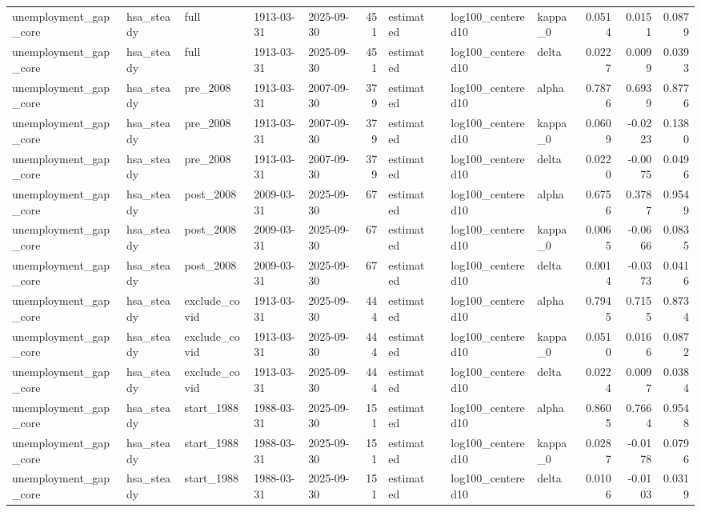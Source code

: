 \begin{tabular}{lllllrllllrrr}
unemployment\_gap\_core & hsa\_steady & full & 1913-03-31 & 2025-09-30 & 451 & estimated &  & log100\_centered10 & kappa\_0 & 0.0514 & 0.0151 & 0.0879 \\
unemployment\_gap\_core & hsa\_steady & full & 1913-03-31 & 2025-09-30 & 451 & estimated &  & log100\_centered10 & delta & 0.0227 & 0.0099 & 0.0393 \\
unemployment\_gap\_core & hsa\_steady & pre\_2008 & 1913-03-31 & 2007-09-30 & 379 & estimated &  & log100\_centered10 & alpha & 0.7876 & 0.6939 & 0.8776 \\
unemployment\_gap\_core & hsa\_steady & pre\_2008 & 1913-03-31 & 2007-09-30 & 379 & estimated &  & log100\_centered10 & kappa\_0 & 0.0609 & -0.0223 & 0.1380 \\
unemployment\_gap\_core & hsa\_steady & pre\_2008 & 1913-03-31 & 2007-09-30 & 379 & estimated &  & log100\_centered10 & delta & 0.0220 & -0.0075 & 0.0496 \\
unemployment\_gap\_core & hsa\_steady & post\_2008 & 2009-03-31 & 2025-09-30 & 67 & estimated &  & log100\_centered10 & alpha & 0.6756 & 0.3787 & 0.9549 \\
unemployment\_gap\_core & hsa\_steady & post\_2008 & 2009-03-31 & 2025-09-30 & 67 & estimated &  & log100\_centered10 & kappa\_0 & 0.0065 & -0.0666 & 0.0835 \\
unemployment\_gap\_core & hsa\_steady & post\_2008 & 2009-03-31 & 2025-09-30 & 67 & estimated &  & log100\_centered10 & delta & 0.0014 & -0.0373 & 0.0416 \\
unemployment\_gap\_core & hsa\_steady & exclude\_covid & 1913-03-31 & 2025-09-30 & 444 & estimated &  & log100\_centered10 & alpha & 0.7945 & 0.7155 & 0.8734 \\
unemployment\_gap\_core & hsa\_steady & exclude\_covid & 1913-03-31 & 2025-09-30 & 444 & estimated &  & log100\_centered10 & kappa\_0 & 0.0510 & 0.0166 & 0.0872 \\
unemployment\_gap\_core & hsa\_steady & exclude\_covid & 1913-03-31 & 2025-09-30 & 444 & estimated &  & log100\_centered10 & delta & 0.0224 & 0.0097 & 0.0384 \\
unemployment\_gap\_core & hsa\_steady & start\_1988 & 1988-03-31 & 2025-09-30 & 151 & estimated &  & log100\_centered10 & alpha & 0.8605 & 0.7664 & 0.9548 \\
unemployment\_gap\_core & hsa\_steady & start\_1988 & 1988-03-31 & 2025-09-30 & 151 & estimated &  & log100\_centered10 & kappa\_0 & 0.0287 & -0.0178 & 0.0796 \\
unemployment\_gap\_core & hsa\_steady & start\_1988 & 1988-03-31 & 2025-09-30 & 151 & estimated &  & log100\_centered10 & delta & 0.0106 & -0.0103 & 0.0319 \\

\end{tabular}
